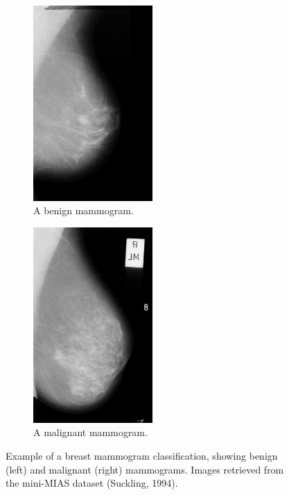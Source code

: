 \begin{figure}[h]
\centering
\begin{subfigure}{.5\textwidth}
  \centering
  \includegraphics[width=0.5\textwidth]{Dissertation/figures/litsurvey/classification_benign.png}
  \caption{A benign mammogram.}
  \label{fig:classification_benign}
\end{subfigure}%
\begin{subfigure}{.5\textwidth}
  \centering
  \includegraphics[width=0.5\textwidth]{Dissertation/figures/litsurvey/classification_malignant.png}
  \caption{A malignant mammogram.}
  \label{fig:classification_malignant}
\end{subfigure}
\caption{\label{fig:classification_example}Example of a breast mammogram classification, showing benign (left) and malignant (right) mammograms. Images retrieved from the mini-MIAS dataset (Suckling, 1994).}
\end{figure}

